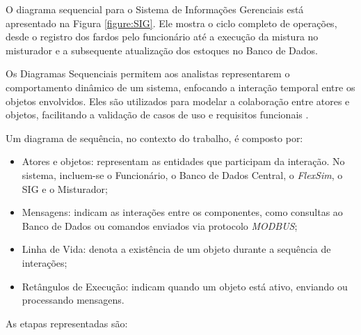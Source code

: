 \documentclass[
    12pt,                %
    openright,           %
    oneside,             %
    a4paper,             %
    english,             %
    spanish,             %
    brazil               %
]{ufscar}
\begin{document}
O diagrama sequencial para o Sistema de Informações Gerenciais está apresentado na Figura \ref{figure:SIG}. Ele mostra o ciclo completo de operações, desde o registro dos fardos pelo funcionário até a execução da mistura no misturador e a subsequente atualização dos estoques no Banco de Dados.




Os Diagramas Sequenciais permitem aos analistas representarem o comportamento dinâmico de um sistema, enfocando a interação temporal entre os objetos envolvidos. Eles são utilizados para modelar a colaboração entre atores e objetos, facilitando a validação de casos de uso e requisitos funcionais \cite{dennis_systems_2009}.

Um diagrama de sequência, no contexto do trabalho, é composto por:

\begin{itemize}
    \item Atores e objetos: representam as entidades que participam da interação. No sistema, incluem-se o Funcionário, o Banco de Dados Central, o \textit{FlexSim}, o SIG e o Misturador;
    \item Mensagens: indicam as interações entre os componentes, como consultas ao Banco de Dados ou comandos enviados via protocolo \textit{MODBUS};
    \item Linha de Vida: denota a existência de um objeto durante a sequência de interações;
    \item Retângulos de Execução: indicam quando um objeto está ativo, enviando ou processando mensagens.
\end{itemize}

As etapas representadas são:
\end{document}

